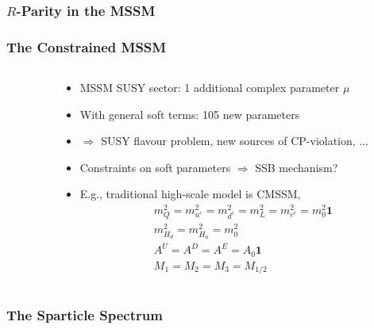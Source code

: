 \documentclass[10pt,aspectratio=169]{beamer}
\begin{document}
\begin{frame}
  \frametitle{$R$-Parity in the MSSM}
\end{frame}

\begin{frame}
  \frametitle{The Constrained MSSM}
  \begin{columns}[t]
    \begin{column}{0.5\textwidth}

    \end{column}
    \begin{column}{0.5\textwidth}
      \begin{itemize}\itemsep1em
      \item MSSM SUSY sector: {\color{blue} 1 additional complex parameter
        $\mu$}
      \item With general soft terms: \alert{105 new parameters}
      \item $\Rightarrow$ SUSY flavour problem, new sources of CP-violation,
        $\ldots$
      \item Constraints on soft parameters $\Rightarrow$ SSB
        mechanism?
      \item E.g., traditional high-scale model is CMSSM,
        \begin{gather*}
          m_Q^2 = m_{u^c}^2 = m_{d^c}^2 = m_L^2 = m_{e^c}^2 = m_0^2 \bm{1} \\
          m_{H_d}^2 = m_{H_u}^2 = m_0^2 \\
          A^U = A^D = A^E = A_0 \bm{1} \\
          M_1 = M_2 = M_3 = M_{1/2}
        \end{gather*}
      \end{itemize}
    \end{column}
  \end{columns}
\end{frame}

\begin{frame}
  \frametitle{The Sparticle Spectrum}
\end{frame}
\end{document}
